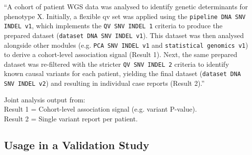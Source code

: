``A cohort of patient WGS data was analysed to identify genetic determinants for phenotype X. Initially, a flexible \ac{qv} set was applied using the 
\colorbox{colorSUNSET1!10}{\texttt{pipeline DNA SNV INDEL v1}}, which implements the \colorbox{colorSUNSET2!20}{\texttt{QV SNV INDEL 1}} criteria to produce the prepared dataset (\colorbox{colorSUNSET3!10}{\texttt{dataset DNA SNV INDEL v1}}). This dataset was then analysed alongside other modules (e.g. \colorbox{colorSUNSET4!10}{\texttt{PCA SNV INDEL v1}} and \colorbox{colorSUNSET5!10}{\texttt{statistical genomics v1}}) to derive a cohort-level association signal (Result 1). Next, the same prepared dataset was re-filtered with the stricter \colorbox{colorSUNSET2!20}{\texttt{QV SNV INDEL 2}} criteria to identify known causal variants for each patient, yielding the final dataset (\colorbox{colorSUNSET3!10}{\texttt{dataset DNA SNV INDEL v2}}) and resulting in individual case reports (Result 2).''

\begin{tcolorbox}[
    colback=white!0,
    colframe=black,
    boxrule=1pt,
    arc=1mm,
    outer arc=1mm,
    title=\textbf{\refstepcounter{myboxcounter}\label{box:pipe}Box \themyboxcounter: Example diagrammatic representation}
]
\medskip

Joint analysis output from:\\
Result 1 = Cohort-level association signal (e.g. variant P-value).\\
Result 2 = Single variant report per patient.
\end{tcolorbox}


\subsection{Usage in a Validation Study}

